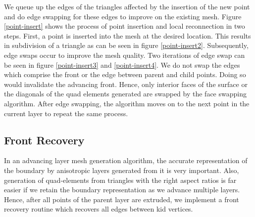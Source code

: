 \documentclass[conf]{new-aiaa}
\begin{document}
We queue up the edges of the triangles affected by the insertion of the new point and do edge swapping for these edges to improve on the existing mesh. Figure \ref{point-insert} shows the process of point insertion and local reconnection in two steps. First, a point is inserted into the mesh at the desired location. This results in subdivision of a triangle as can be seen in figure \ref{point-insert2}. Subsequently, edge swaps occur to improve the mesh quality. Two iterations of edge swap can be seen in figure \ref{point-insert3} and \ref{point-insert4}. We do not swap the edges which comprise the front or the edge between parent and child points. Doing so would invalidate the advancing front. Hence, only interior faces of the surface or the diagonals of the quad elements generated are swapped by the face swapping algorithm. After edge swapping, the algorithm moves on to the next point in the current layer to repeat the same process.

\subsection{Front Recovery}

In an advancing layer mesh generation algorithm, the accurate representation of the boundary by anisotropic layers generated from it is very important. Also, generation of quad-elements from triangles with the right aspect ratios is far easier if we retain the boundary representation as we advance multiple layers. Hence, after all points of the parent layer are extruded, we implement a front recovery routine which recovers all edges between kid vertices.
\end{document}
